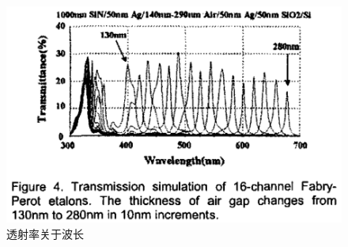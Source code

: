 \begin{frame}[c]
\begin{columns}
\begin{column}{.5\textwidth}
\begin{figure}[H]
                \includegraphics[width=.9\textwidth]{figures/A 16-channel array-type microspectrometer using integrated Fabry-Perot etalons and lateral pin photodetectors_2.png} %
                \caption{透射率关于波长} %
            \end{figure}
        \end{column}
    \end{columns}
\end{frame}

